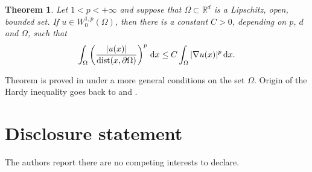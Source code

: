 \documentclass[11pt, a4paper, reqno]{amsart}
\newtheorem{theorem}{Theorem}[section]
\newcommand{\R}{{\mathbb R}}
\numberwithin{equation}{section}
\newcommand{\dx}{\,{\rm d} {x}}
\newcommand{\dist}{\operatorname{dist}}
\begin{document}
\begin{theorem}\label{thm:hardy}
  Let $1<p<+\infty$ and suppose that $\Omega\subset\R^d$ is a Lipschitz, open, bounded set. If $u\in W^{1,p}_0(\Omega)$, then there is a constant $C>0$, depending on $p$, $d$ and $\Omega$, such that
  $$
  \int_{\Omega}\left(\frac{|u(x)|}{\dist(x,\partial\Omega)}\right)^p\dx\leq
  C\int_{\Omega}|\nabla u(x)|^p\dx.
  $$
\end{theorem}
Theorem is proved in \cite[Corollary~3.11]{KiMa1997} under a more general conditions on the set $\Omega$. Origin of the Hardy inequality goes back to \cite{HaLiPo1952} and \cite{Ne1962}.

\section{Disclosure statement}
The authors report there are no competing interests to declare.




\end{document}

